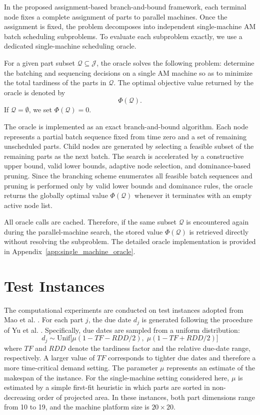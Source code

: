 \documentclass[review,3p,times,authoryear]{elsarticle}
\begin{document}
In the proposed assignment-based branch-and-bound framework, each terminal
node fixes a complete assignment of parts to parallel machines. Once the
assignment is fixed, the problem decomposes into independent single-machine
AM batch scheduling subproblems. To evaluate each subproblem exactly, we use
a dedicated single-machine scheduling oracle.

For a given part subset $\mathcal{Q}\subseteq\mathcal{J}$, the oracle solves
the following problem: determine the batching and sequencing decisions on a
single AM machine so as to minimize the total tardiness of the parts in
$\mathcal{Q}$. The optimal objective value returned by the oracle is denoted
by
\[
\Phi(\mathcal{Q}).
\]
If $\mathcal{Q}=\emptyset$, we set $\Phi(\mathcal{Q})=0$.

The oracle is implemented as an exact branch-and-bound algorithm. Each node
represents a partial batch sequence fixed from time zero and a set of
remaining unscheduled parts. Child nodes are generated by selecting a
feasible subset of the remaining parts as the next batch. The search is
accelerated by a constructive upper bound, valid lower bounds, adaptive node
selection, and dominance-based pruning. Since the branching scheme enumerates
all feasible batch sequences and pruning is performed only by valid lower
bounds and dominance rules, the oracle returns the globally optimal value
$\Phi(\mathcal{Q})$ whenever it terminates with an empty active node list.

All oracle calls are cached. Therefore, if the same subset $\mathcal{Q}$ is
encountered again during the parallel-machine search, the stored value
$\Phi(\mathcal{Q})$ is retrieved directly without resolving the subproblem.
The detailed oracle implementation is provided in
Appendix~\ref{app:single_machine_oracle}.

\section{Test Instances}
\label{sec:instances}
The computational experiments are conducted on test instances adopted from Mao et al. \cite{maoCombinatorialBendersDecomposition2024}. For each part $j$, the due date $d_j$ is generated following the procedure of Yu et al. \cite{yuMathematicalModelsMinimizing2022}. Specifically, due dates are sampled from a uniform distribution:
\begin{equation}
	d_j \sim \text{Unif} \big[ \mu(1 - TF - RDD/2), \; \mu(1 - TF + RDD/2) \big]
\end{equation}
where $TF$ and $RDD$ denote the tardiness factor and the relative due-date range, respectively. A larger value of $TF$ corresponds to tighter due dates and therefore a more time-critical demand setting. The parameter $\mu$ represents an estimate of the makespan of the instance. For the single-machine setting considered here, $\mu$ is estimated by a simple first-fit heuristic in which parts are sorted in non-decreasing order of projected area. In these instances, both part dimensions range from 10 to 19, and the machine platform size is $20 \times 20$.
\end{document}

